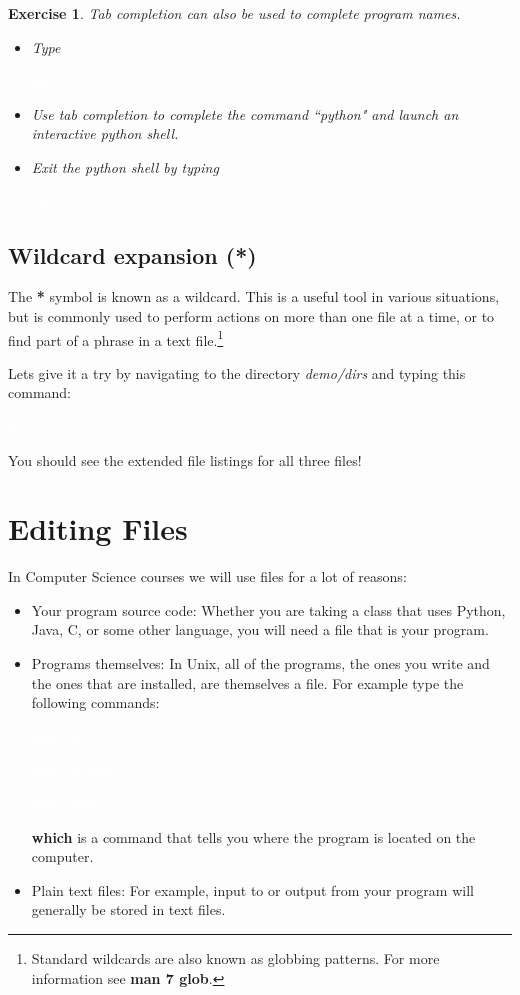 \documentclass[oneside]{book}
\newcommand{\commandline}[1]{\begin{center} \colorbox{Dark}{\textcolor{white}{#1}} \end{center}}
\newtheorem{ex}{Exercise}[chapter]
\begin{document}
\begin{ex}
    Tab completion can also be used to complete program names.
    \begin{itemize} 
        \item Type \commandline{pyt}
        \item Use tab completion to complete the command ``python" and launch an interactive python shell.
        \item Exit the python shell by typing \commandline{exit()}
    \end{itemize}
\end{ex}

\subsection{Wildcard expansion (*)}
The \textbf{*} symbol is known as a wildcard. This is a useful tool in various situations, but is commonly used to perform actions on more than one file at a time, or to find part of a phrase in a text file.\footnote{Standard wildcards are also known as globbing patterns. For more information see \textbf{man 7 glob}.} 

Lets give it a try by navigating to the directory \textit{demo/dirs} and typing this command:
\commandline{ls -l f*}

You should see the extended file listings for all three files!

\section{Editing Files}
 In Computer Science courses we will use files for a lot of reasons:
\begin{itemize}
	\item Your program source code: Whether you are taking a class that uses Python, Java, C, or some other language, you will need a file that is your program.
	\item Programs themselves: In Unix, all of the programs, the ones you write and the ones that are installed, are themselves a file. For example type the following commands:
		\commandline{which ls}
		\commandline{which python}
		\commandline{which which}
	\textbf{which} is a command that tells you where the program is located on the computer. 
	\item Plain text files: For example, input to or output from your program will generally be stored in text files. 
\end{itemize}
\end{document}
